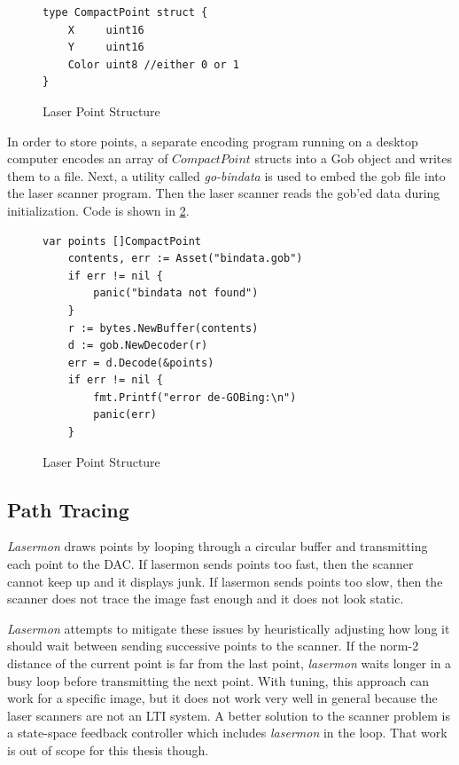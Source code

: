 \begin{figure}[!h]
\begin{center}
\begin{lstlisting}
type CompactPoint struct {
	X     uint16
	Y     uint16
	Color uint8 //either 0 or 1
}
\end{lstlisting}
\end{center}
  \caption{Laser Point Structure} \label{fig:cpoint}
\end{figure}

In order to store points, a separate encoding program running
on a desktop computer encodes an array of $CompactPoint$ structs into
a Gob object and writes them to a file. Next, a utility called
\textit{go-bindata} is used to embed the gob file into the laser scanner
program. Then the laser scanner reads the gob'ed data during initialization.
Code is shown in \ref{fig:loadpoints}.

\begin{figure}[h]
\begin{center}
\begin{lstlisting}
var points []CompactPoint
	contents, err := Asset("bindata.gob")
	if err != nil {
		panic("bindata not found")
	}
	r := bytes.NewBuffer(contents)
	d := gob.NewDecoder(r)
	err = d.Decode(&points)
	if err != nil {
		fmt.Printf("error de-GOBing:\n")
		panic(err)
	}
\end{lstlisting}
\end{center}
  \caption{Laser Point Structure} \label{fig:loadpoints}
\end{figure}

\subsection{Path Tracing}
\textit{Lasermon} draws points by looping through a circular buffer and transmitting each point to
the DAC. If lasermon sends points too fast, then the scanner cannot keep up and it displays junk. If
lasermon sends points too slow, then the scanner does not trace the image fast enough and it does not
look static.

\textit{Lasermon} attempts to mitigate these issues by heuristically adjusting how long it should wait between
sending successive points to the scanner. If the norm-2 distance of the current point is far from the last
point, \textit{lasermon} waits longer in a busy loop before transmitting the next point. With tuning, this approach can
work for a specific image, but it does not
work very well in general because the laser scanners are not an LTI system. A better solution to the scanner problem
is a state-space feedback controller which includes \textit{lasermon} in the loop. That work is out of scope for
this thesis though.

